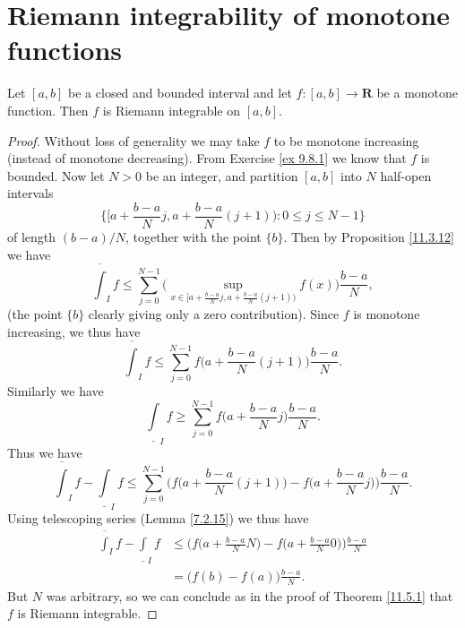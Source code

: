 \section{Riemann integrability of monotone functions}\label{sec 11.6}

\begin{proposition}\label{11.6.1}
    Let \([a, b]\) be a closed and bounded interval and let \(f : [a, b] \to \mathbf{R}\) be a monotone function.
    Then \(f\) is Riemann integrable on \([a, b]\).
\end{proposition}

\begin{proof}
    Without loss of generality we may take \(f\) to be monotone increasing (instead of monotone decreasing).
    From Exercise \ref{ex 9.8.1} we know that \(f\) is bounded.
    Now let \(N > 0\) be an integer, and partition \([a, b]\) into \(N\) half-open intervals
    \[
        \bigg\{\big[a + \frac{b - a}{N} j, a + \frac{b - a}{N} (j + 1)\big) : 0 \leq j \leq N - 1\bigg\}
    \]
    of length \((b - a) / N\), together with the point \(\{b\}\).
    Then by Proposition \ref{11.3.12} we have
    \[
        \overline{\int}_I f \leq \sum_{j = 0}^{N - 1} \Bigg(\sup_{x \in \big[a + \frac{b - a}{N} j, a + \frac{b - a}{N} (j + 1)\big)} f(x)\Bigg) \frac{b - a}{N},
    \]
    (the point \(\{b\}\) clearly giving only a zero contribution).
    Since \(f\) is monotone increasing, we thus have
    \[
        \overline{\int}_I f \leq \sum_{j = 0}^{N - 1} f\bigg(a + \frac{b - a}{N} (j + 1)\bigg) \frac{b - a}{N}.
    \]
    Similarly we have
    \[
        \underline{\int}_I f \geq \sum_{j = 0}^{N - 1} f\bigg(a + \frac{b - a}{N} j\bigg) \frac{b - a}{N}.
    \]
    Thus we have
    \[
        \overline{\int}_I f - \underline{\int}_I f \leq \sum_{j = 0}^{N - 1} \Bigg(f\bigg(a + \frac{b - a}{N} (j + 1)\bigg) - f\bigg(a + \frac{b - a}{N} j\bigg)\Bigg) \frac{b - a}{N}.
    \]
    Using telescoping series (Lemma \ref{7.2.15}) we thus have
    \begin{align*}
        \overline{\int}_I f - \underline{\int}_I f & \leq \Bigg(f\bigg(a + \frac{b - a}{N} N\bigg) - f\bigg(a + \frac{b - a}{N} 0\bigg)\Bigg) \frac{b - a}{N} \\
                                                   & = \big(f(b) - f(a)\big) \frac{b - a}{N}.
    \end{align*}
    But \(N\) was arbitrary, so we can conclude as in the proof of Theorem \ref{11.5.1} that \(f\) is Riemann integrable.
\end{proof}

